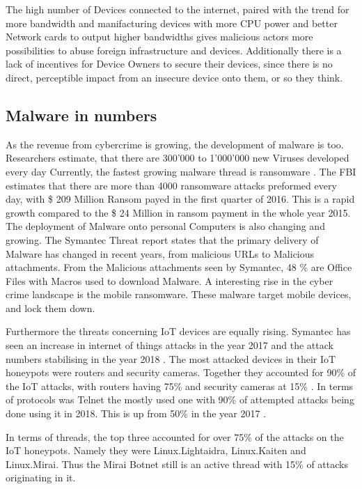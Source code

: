 The high number of Devices connected to the internet, paired with the trend for more bandwidth and manifacturing devices with more CPU power and better Network cards to output higher bandwidths gives malicious actors more possibilities to abuse foreign infrastructure and devices. 
Additionally there is a lack of incentives for Device Owners to secure their devices, since there is no direct, perceptible impact from an insecure device onto them, or so they think. 

\subsection{Malware in numbers}
As the revenue from cybercrime is growing, the development of malware is too. Researchers estimate, that there are 300'000 to 1'000'000 new Viruses developed every day  \cite{McAfee18} Currently, the fastest growing malware thread is ransomware  \cite{McAfee18}. The FBI estimates that there are more than 4000 ransomware attacks preformed every day, with \$ 209 Million Ransom payed in the first quarter of 2016. This is a rapid growth compared to the \$ 24 Million in ransom payment in the whole year 2015. 
The deployment of Malware onto personal Computers is also changing and growing. The Symantec Threat report states that the primary delivery of Malware has changed in recent years, from malicious URLs to Malicious attachments. From the Malicious attachments seen by Symantec, 48 \% are Office Files with Macros used to download Malware. 
A interesting rise in the cyber crime landscape is the mobile ransomware. These malware target mobile devices, and lock them down. \cite{Symantec19}

Furthermore the threats concerning IoT devices are equally rising. Symantec has seen an increase in internet of things attacks in the year 2017 and the attack numbers stabilising in the year 2018 \cite{Symantec19}. The most attacked devices in their IoT honeypots were routers and security cameras. Together they accounted for 90\% of the IoT attacks, with routers having 75\% and security cameras at 15\% \cite{Symantec19}. In terms of protocols was Telnet the mostly used one with 90\% of attempted attacks being done using it in 2018. This is up from 50\% in the year 2017 \cite{Symantec19}. 

In terms of threads, the top three accounted for over 75\% of the attacks on the IoT honeypots. Namely they were Linux.Lightaidra, Linux.Kaiten and Linux.Mirai. Thus the Mirai Botnet still is an active thread with 15\% of attacks originating in it. \cite{Symantec19}

